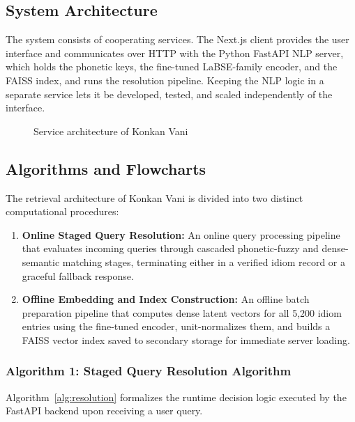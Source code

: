 \documentclass[12pt,a4paper]{article}
\begin{document}
\subsection{System Architecture}
The system consists of cooperating services. The Next.js client provides the user interface and communicates over HTTP with the Python FastAPI NLP server, which holds the phonetic keys, the fine-tuned LaBSE-family encoder, and the FAISS index, and runs the resolution pipeline. Keeping the NLP logic in a separate service lets it be developed, tested, and scaled independently of the interface.

\begin{figure}[H]
\centering
{}
\caption{Service architecture of Konkan Vani}
\label{fig:architecture}
\end{figure}

\subsection{Algorithms and Flowcharts}
The retrieval architecture of Konkan Vani is divided into two distinct computational procedures:
\begin{enumerate}
  \item \textbf{Online Staged Query Resolution:} An online query processing pipeline that evaluates incoming queries through cascaded phonetic-fuzzy and dense-semantic matching stages, terminating either in a verified idiom record or a graceful fallback response.
  \item \textbf{Offline Embedding and Index Construction:} An offline batch preparation pipeline that computes dense latent vectors for all 5,200 idiom entries using the fine-tuned encoder, unit-normalizes them, and builds a FAISS vector index saved to secondary storage for immediate server loading.
\end{enumerate}

\subsubsection{Algorithm 1: Staged Query Resolution Algorithm}
Algorithm~\ref{alg:resolution} formalizes the runtime decision logic executed by the FastAPI backend upon receiving a user query.
\end{document}
